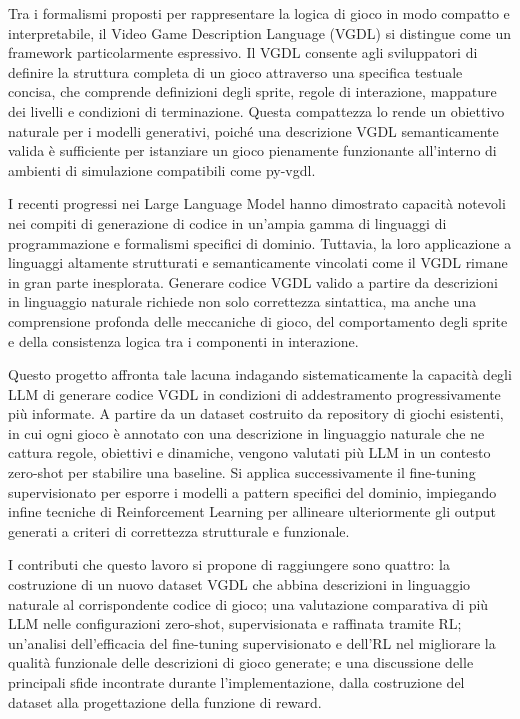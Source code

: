 \documentclass[final,5p,times,twocolumn]{elsarticle}
\begin{document}
Tra i formalismi proposti per rappresentare la logica di gioco in modo compatto e interpretabile, il Video Game Description Language (VGDL) \citep{6633610} si distingue come un framework particolarmente espressivo. Il VGDL consente agli sviluppatori di definire la struttura completa di un gioco attraverso una specifica testuale concisa, che comprende definizioni degli sprite, regole di interazione, mappature dei livelli e condizioni di terminazione. Questa compattezza lo rende un obiettivo naturale per i modelli generativi, poiché una descrizione VGDL semanticamente valida è sufficiente per istanziare un gioco pienamente funzionante all'interno di ambienti di simulazione compatibili come py-vgdl.

I recenti progressi nei Large Language Model hanno dimostrato capacità notevoli nei compiti di generazione di codice in un'ampia gamma di linguaggi di programmazione e formalismi specifici di dominio. Tuttavia, la loro applicazione a linguaggi altamente strutturati e semanticamente vincolati come il VGDL rimane in gran parte inesplorata. Generare codice VGDL valido a partire da descrizioni in linguaggio naturale richiede non solo correttezza sintattica, ma anche una comprensione profonda delle meccaniche di gioco, del comportamento degli sprite e della consistenza logica tra i componenti in interazione. 

Questo progetto affronta tale lacuna indagando sistematicamente la capacità degli LLM di generare codice VGDL in condizioni di addestramento progressivamente più informate. A partire da un dataset costruito da repository di giochi esistenti, in cui ogni gioco è annotato con una descrizione in linguaggio naturale che ne cattura regole, obiettivi e dinamiche, vengono valutati più LLM in un contesto zero-shot per stabilire una baseline. Si applica successivamente il fine-tuning supervisionato per esporre i modelli a pattern specifici del dominio, impiegando infine tecniche di Reinforcement Learning per allineare ulteriormente gli output generati a criteri di correttezza strutturale e funzionale.

I contributi che questo lavoro si propone di raggiungere sono quattro: la costruzione di un nuovo dataset VGDL che abbina descrizioni in linguaggio naturale al corrispondente codice di gioco; una valutazione comparativa di più LLM nelle configurazioni zero-shot, supervisionata e raffinata tramite RL; un'analisi dell'efficacia del fine-tuning supervisionato e dell'RL nel migliorare la qualità funzionale delle descrizioni di gioco generate; e una discussione delle principali sfide incontrate durante l'implementazione, dalla costruzione del dataset alla progettazione della funzione di reward.
\end{document}
